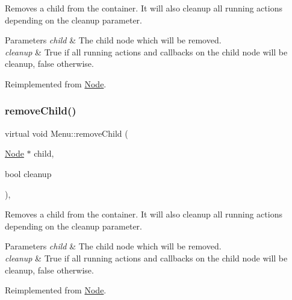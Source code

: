 Removes a child from the container. It will also cleanup all running actions depending on the cleanup parameter.


\begin{DoxyParams}{Parameters}
{\em child} & The child node which will be removed. \\
\hline
{\em cleanup} & True if all running actions and callbacks on the child node will be cleanup, false otherwise. \\
\hline
\end{DoxyParams}


Reimplemented from \hyperlink{classNode_a872d4a7d389b26b0c6ad7ed99c8b1b65}{Node}.

\mbox{\label{classMenu_ab08cab6e153f4d7fabf06cbc941c8c58}} 
\subsubsection{\texorpdfstring{remove\+Child()}{removeChild()}\hspace{0.1cm}{\footnotesize\ttfamily [2/2]}}
{\footnotesize\ttfamily virtual void Menu\+::remove\+Child (\begin{DoxyParamCaption}\item[{\hyperlink{classNode}{Node} $\ast$}]{child,  }\item[{bool}]{cleanup }\end{DoxyParamCaption})\hspace{0.3cm}{\ttfamily [override]}, {\ttfamily [virtual]}}

Removes a child from the container. It will also cleanup all running actions depending on the cleanup parameter.


\begin{DoxyParams}{Parameters}
{\em child} & The child node which will be removed. \\
\hline
{\em cleanup} & True if all running actions and callbacks on the child node will be cleanup, false otherwise. \\
\hline
\end{DoxyParams}


Reimplemented from \hyperlink{classNode_a872d4a7d389b26b0c6ad7ed99c8b1b65}{Node}.

\mbox{\label{classMenu_a3f1338bc3391dd127892035935b48cdc}} 
